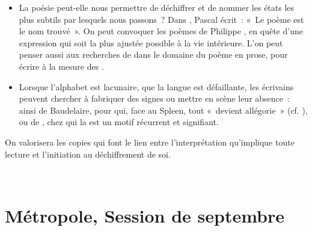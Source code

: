 {\begin{itemize}
peut-elle s'envisager, en certaines pages, comme une quête de l'effet inouï provoqué
par telle sensation extrêmement ténue, dont la fameuse madeleine est le plus connu.
De même, dans un tout autre registre, la poésie de , déploie dans  un inventaire des objets les plus familiers~: pouvoir les regarder d'un œil
neuf, en éprouver la matière et en \textit{déchiffrer} la composition par le langage peut être
source d'émotions infimes et éphémères.
\item La poésie peut-elle nous permettre de déchiffrer et de nommer les états les plus
subtils par lesquels nous passons~? Dans , Pascal
 écrit~: «~Le poème est le nom trouvé~». On peut convoquer les poèmes de
Philippe , en quête d'une expression qui soit la plus ajustée possible à la vie
intérieure. L'on peut penser aussi aux recherches de  dans le domaine du
poème en prose, pour écrire à la mesure des .
\item Lorsque l'alphabet est lacunaire, que la langue est défaillante, les écrivains peuvent
chercher à fabriquer des signes ou mettre en scène leur absence~: ainsi de Baudelaire,
pour qui, face au Spleen, tout «~devient allégorie~» (cf. ), ou de ,
chez qui la  est un motif récurrent et signifiant.
\end{itemize}

On valorisera les copies qui font le lien entre l'interprétation qu'implique toute lecture
et l'initiation au déchiffrement de soi.}

\vfill{~}\clearpage

\section{Métropole, Session de septembre}

